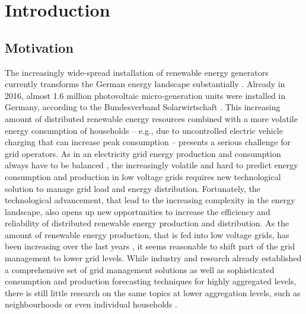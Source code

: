 
\section{Introduction}\label{Sec:Intro}




\subsection{Motivation}\label{Sec:Intro;Subsec:Motivation}

The increasingly wide-spread installation of renewable energy generators currently transforms the German energy landscape substantially \citep{Bayer:2018}. Already in 2016, almost 1.6 million photovoltaic micro-generation units were installed in Germany, according to the Bundesverband Solarwirtschaft \citep{BSW-Solar:2017}. This increasing amount of distributed renewable energy resources combined with a more volatile energy consumption of households – e.g., due to uncontrolled electric vehicle charging that can increase peak consumption \citep{Fitzgerald:2016,Floch:2017} – presents a serious challenge for grid operators. As in an electricity grid energy production and consumption always have to be balanced \citep{Weron:2006}, the increasingly volatile and hard to predict energy consumption and production in low voltage grids requires new technological solution to manage grid load and energy distribution.
Fortunately, the technological advancement, that lead to the increasing complexity in the energy landscape, also opens up new opportunities to increase the efficiency and reliability of distributed renewable energy production and distribution. As the amount of renewable energy production, that is fed into low voltage grids, has been increasing over the last years \citep{Bayer:2018}, it seems reasonable to shift part of the grid management to lower grid levels. While industry and research already established a comprehensive set of grid management solutions as well as sophisticated consumption and production forecasting techniques for highly aggregated levels, there is still little research on the same topics at lower aggregation levels, such as neighbourhoods or even individual households \citep{Meer:2018}.
